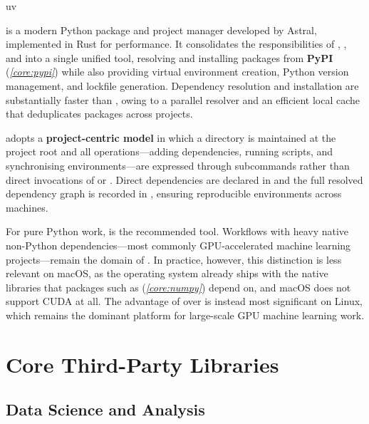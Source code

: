 \documentclass[10pt]{article}
\begin{document}
    \begin{core}[label=core:uv]{uv}

       is a modern Python package and project manager developed by Astral, implemented in Rust for performance. It consolidates the responsibilities of , , and  into a single unified tool, resolving and installing packages from \textbf{PyPI} (\textit{\autoref{core:pypi}}) while also providing virtual environment creation, Python version management, and lockfile generation. Dependency resolution and installation are substantially faster than , owing to a parallel resolver and an efficient local cache that deduplicates packages across projects.

       adopts a \textbf{project-centric model} in which a  directory is maintained at the project root and all operations---adding dependencies, running scripts, and synchronising environments---are expressed through  subcommands rather than direct invocations of  or . Direct dependencies are declared in  and the full resolved dependency graph is recorded in , ensuring reproducible environments across machines.

      For pure Python work,  is the recommended tool. Workflows with heavy native non-Python dependencies---most commonly GPU-accelerated machine learning projects---remain the domain of . In practice, however, this distinction is less relevant on macOS, as the operating system already ships with the native libraries that packages such as  (\textit{\autoref{core:numpy}}) depend on, and macOS does not support CUDA at all. The advantage of  over  is instead most significant on Linux, which remains the dominant platform for large-scale GPU machine learning work.

    \end{core}

\section{Core Third-Party Libraries}

  \subsection{Data Science and Analysis}
\end{document}
